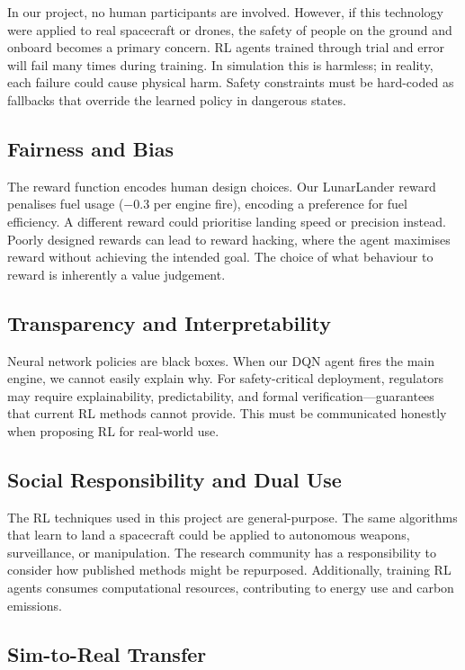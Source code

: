 \documentclass[11pt,a4paper]{article}
\begin{document}
In our project, no human participants are involved. However, if this technology were applied to real spacecraft or drones, the safety of people on the ground and onboard becomes a primary concern. RL agents trained through trial and error will fail many times during training. In simulation this is harmless; in reality, each failure could cause physical harm. Safety constraints must be hard-coded as fallbacks that override the learned policy in dangerous states.

\subsection{Fairness and Bias}

The reward function encodes human design choices. Our LunarLander reward penalises fuel usage ($-0.3$ per engine fire), encoding a preference for fuel efficiency. A different reward could prioritise landing speed or precision instead. Poorly designed rewards can lead to reward hacking, where the agent maximises reward without achieving the intended goal. The choice of what behaviour to reward is inherently a value judgement.

\subsection{Transparency and Interpretability}

Neural network policies are black boxes. When our DQN agent fires the main engine, we cannot easily explain why. For safety-critical deployment, regulators may require explainability, predictability, and formal verification---guarantees that current RL methods cannot provide. This must be communicated honestly when proposing RL for real-world use.

\subsection{Social Responsibility and Dual Use}

The RL techniques used in this project are general-purpose. The same algorithms that learn to land a spacecraft could be applied to autonomous weapons, surveillance, or manipulation. The research community has a responsibility to consider how published methods might be repurposed. Additionally, training RL agents consumes computational resources, contributing to energy use and carbon emissions.

\subsection{Sim-to-Real Transfer}
\end{document}
